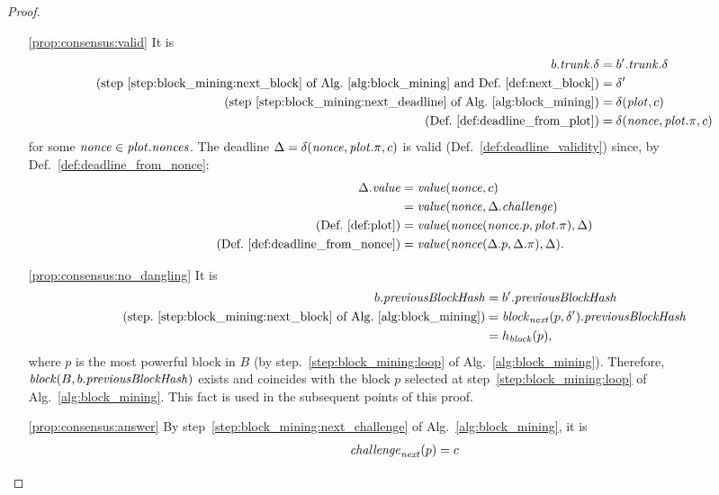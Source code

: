 \begin{proof}
\begin{itemize}
\begin{itemize}
    \item[\ref{prop:consensus:valid}] It is
      \begin{align*}
        b.{\mathit{trunk}}.\delta&=b'.{\mathit{trunk}}.\delta\\
        \text{(step~\ref{step:block_mining:next_block} of Alg.~\ref{alg:block_mining} and Def.~\ref{def:next_block})}&=\delta'\\
        \text{(step~\ref{step:block_mining:next_deadline} of Alg.~\ref{alg:block_mining})}&=
        \delta({\mathit{plot}},c)\\
        \text{(Def.~\ref{def:deadline_from_plot})}&=\delta({\mathit{nonce}},{\mathit{plot}}.\pi,c)
      \end{align*}
      for some ${\mathit{nonce}}\in{\mathit{plot}}.{\mathit{nonces}}$. The deadline $\Delta=\delta({\mathit{nonce}},{\mathit{plot}}.\pi,c)$ is valid
      (Def.~\ref{def:deadline_validity}) since, by Def.~\ref{def:deadline_from_nonce}:
      \begin{align*}
        \Delta.\mathit{value}&=\mathit{value}({\mathit{nonce}},c)\\
        &=\mathit{value}({\mathit{nonce}},\Delta.{\mathit{challenge}})\\
        \text{(Def.~\ref{def:plot})}&=\mathit{value}({\mathit{nonce}}({\mathit{nonce}}.p,{\mathit{plot}}.\pi),\Delta)\\
        \text{(Def.~\ref{def:deadline_from_nonce})}&=\mathit{value}({\mathit{nonce}}(\Delta.p,\Delta.\pi),\Delta).
      \end{align*}
    \item[\ref{prop:consensus:no_dangling}] It is
      \begin{align*}
        b.{\mathit{previousBlockHash}}&=b'.{\mathit{previousBlockHash}}\\
        \text{(step.~\ref{step:block_mining:next_block} of Alg.~\ref{alg:block_mining})}
        &={\mathit{block}}_{\mathit{next}}(p,\delta').{\mathit{previousBlockHash}}\\
        &=h_{\mathit{block}}(p),
      \end{align*}
      where $p$ is the most powerful block in $B$ (by step.~\ref{step:block_mining:loop}
      of Alg.~\ref{alg:block_mining}). Therefore, ${\mathit{block}}(B,b.{\mathit{previousBlockHash}})$ exists
      and coincides with the block $p$ selected at step~\ref{step:block_mining:loop}
      of Alg.~\ref{alg:block_mining}. This fact is used in the subsequent points of this proof.
    \item[\ref{prop:consensus:answer}] By step~\ref{step:block_mining:next_challenge}
      of Alg.~\ref{alg:block_mining}, it is
      \begin{align*}
        \challenge_\mynext(p)&=c\\

\end{align*}
\end{itemize}
\end{itemize}
\end{proof}
